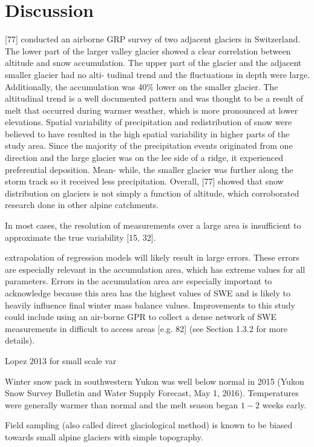 \documentclass[twocolumn,letterpaper]{igs}
\begin{document}
\section{Discussion}
[77] conducted an airborne GRP survey of two adjacent glaciers in Switzerland. The
lower part of the larger valley glacier showed a clear correlation between altitude and snow
accumulation. The upper part of the glacier and the adjacent smaller glacier had no alti-
tudinal trend and the fluctuations in depth were large. Additionally, the accumulation was
40\% lower on the smaller glacier. The altitudinal trend is a well documented pattern and
was thought to be a result of melt that occurred during warmer weather, which is more
pronounced at lower elevations. Spatial variability of precipitation and redistribution of
snow were believed to have resulted in the high spatial variability in higher parts of the
study area. Since the majority of the precipitation events originated from one direction and
the large glacier was on the lee side of a ridge, it experienced preferential deposition. Mean-
while, the smaller glacier was further along the storm track so it received less precipitation.
Overall, [77] showed that snow distribution on glaciers is not simply a function of altitude,
which corroborated research done in other alpine catchments.

 In most cases, the resolution of measurements over a large area is insufficient to
approximate the true variability [15, 32].


extrapolation of regression models will
likely result in large errors. These errors are especially relevant in the accumulation area,
which has extreme values for all parameters. Errors in the accumulation area are especially
important to acknowledge because this area has the highest values of SWE and is likely to
heavily influence final winter mass balance values. Improvements to this study could include
using an air-borne GPR to collect a dense network of SWE measurements in difficult to
access areas [e.g. 82] (see Section 1.3.2 for more details).


Lopez 2013 for small scale var

Winter snow pack in southwestern Yukon was well below normal in 2015 (Yukon Snow Survey Bulletin and Water Supply Forecast, May 1, 2016). Temperatures were generally warmer than normal and the melt season began $1-2$ weeks early. 

Field sampling (also called direct glaciological method) is known to be biased towards small alpine glaciers with simple topography.
\end{document}
